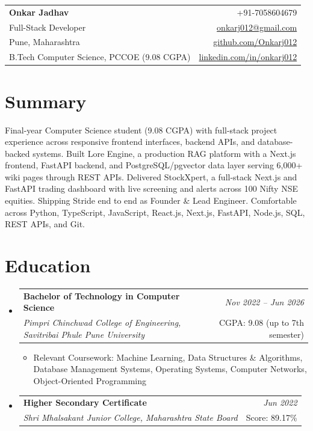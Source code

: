 \documentclass[a4paper,11pt]{article}
\makeatletter
\newcommand{\resumeSubheading}[4]{
\vspace{0.5mm}\item
    \begin{tabular*}{0.98\textwidth}[t]{l@{\extracolsep{\fill}}r}
        \textbf{#1} & \textit{\footnotesize{#4}} \\
        \textit{\footnotesize{#3}} & \footnotesize{#2}\\
    \end{tabular*}
    \vspace{-2.4mm}
}
\newcommand{\resumeSubHeadingListStart}{\begin{itemize}[leftmargin=*,labelsep=0mm]}
\newcommand{\resumeItemListStart}{\begin{justify}\begin{itemize}[leftmargin=3ex, rightmargin=2ex, noitemsep,labelsep=1.2mm,itemsep=0mm]\small}
\newcommand{\resumeSubHeadingListEnd}{\end{itemize}\vspace{2mm}}
\newcommand{\resumeItemListEnd}{\end{itemize}\end{justify}\vspace{-2mm}}
\newcommand{\name}{Onkar Jadhav}
\newcommand{\phone}{7058604679}
\newcommand{\emaila}{onkarj012@gmail.com}
\newcommand{\github}{github.com/Onkarj012}
\newcommand{\linkedin}{linkedin.com/in/onkarj012}
\makeatother
\begin{document}
\selectfont

\begin{tabularx}{\linewidth}{L r}
  \textbf{\Large \name} & {+91-\phone} \\
  {Full-Stack Developer} & \href{mailto:\emaila}{\emaila} \\
  {Pune, Maharashtra} & \href{https://\github}{\github} \\
  {B.Tech Computer Science, PCCOE (9.08 CGPA)} & \href{https://\linkedin}{\linkedin}
\end{tabularx}
\vspace{-4mm}

\section{\textbf{Summary}}
\vspace{1mm}
\small{
Final-year Computer Science student (9.08 CGPA) with full-stack project experience across responsive frontend interfaces, backend APIs, and database-backed systems. Built Lore Engine, a production RAG platform with a Next.js frontend, FastAPI backend, and PostgreSQL/pgvector data layer serving 6,000+ wiki pages through REST APIs. Delivered StockXpert, a full-stack Next.js and FastAPI trading dashboard with live screening and alerts across 100 Nifty NSE equities. Shipping Stride end to end as Founder \& Lead Engineer. Comfortable across Python, TypeScript, JavaScript, React.js, Next.js, FastAPI, Node.js, SQL, REST APIs, and Git.
}
\vspace{-3mm}

\section{\textbf{Education}}
  \resumeSubHeadingListStart
    \resumeSubheading
      {Bachelor of Technology in Computer Science}{CGPA: 9.08 (up to 7th semester)}
      {Pimpri Chinchwad College of Engineering, Savitribai Phule Pune University}{Nov 2022 -- Jun 2026}
      \resumeItemListStart
        \item {Relevant Coursework: Machine Learning, Data Structures \& Algorithms, Database Management Systems, Operating Systems, Computer Networks, Object-Oriented Programming}
      \resumeItemListEnd
    \resumeSubheading
      {Higher Secondary Certificate}{Score: 89.17\%}
      {Shri Mhalsakant Junior College, Maharashtra State Board}{Jun 2022}
  \resumeSubHeadingListEnd
\vspace{-5.5mm}
\end{document}
